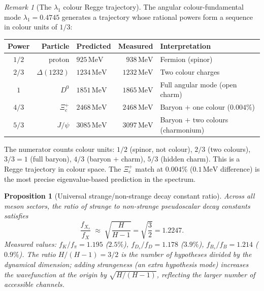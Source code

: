\documentclass[11pt,a4paper]{article}
\let\hline\midrule
\newtheorem{proposition}[theorem]{Proposition}
\theoremstyle{definition}
\theoremstyle{remark}
\newtheorem{remark}[theorem]{Remark}
\begin{document}
\begin{remark}[The $\lambda_1$ colour Regge trajectory]\label{rem:colour_regge}
The angular colour-fundamental mode $\lambda_1=0.4745$ generates a trajectory whose rational powers form a sequence in colour units of $1/3$:
\begin{center}
\renewcommand{\arraystretch}{1.15}
\begin{tabular}{crlrl}
\hline
Power & Particle & Predicted & Measured & Interpretation \\
\hline
$1/2$ & proton & $925\,\mathrm{MeV}$ & $938\,\mathrm{MeV}$ & Fermion (spinor) \\
$2/3$ & $\Delta(1232)$ & $1234\,\mathrm{MeV}$ & $1232\,\mathrm{MeV}$ & Two colour charges \\
$1$ & $D^0$ & $1851\,\mathrm{MeV}$ & $1865\,\mathrm{MeV}$ & Full angular mode (open charm) \\
$4/3$ & $\Xi_c^+$ & $2468\,\mathrm{MeV}$ & $2468\,\mathrm{MeV}$ & Baryon $+$ one colour ($0.004\%$) \\
$5/3$ & $J/\psi$ & $3085\,\mathrm{MeV}$ & $3097\,\mathrm{MeV}$ & Baryon $+$ two colours (charmonium) \\
\hline
\end{tabular}
\end{center}
The numerator counts colour units: $1/2$ (spinor, not colour), $2/3$ (two colours), $3/3=1$ (full baryon), $4/3$ (baryon $+$ charm), $5/3$ (hidden charm). This is a Regge trajectory in colour space. The $\Xi_c^+$ match at $0.004\%$ ($0.1\,\mathrm{MeV}$ difference) is the most precise eigenvalue-based prediction in the spectrum.
\end{remark}

\begin{proposition}[Universal strange/non-strange decay constant ratio]\label{prop:decay_const_ratio}
Across all meson sectors, the ratio of strange to non-strange pseudoscalar decay constants satisfies
\begin{equation}\label{eq:fX_ratio}
\frac{f_{X_s}}{f_X}\;\approx\;\sqrt{\frac{H}{H-1}}=\sqrt{\frac{3}{2}}=1.2247.
\end{equation}
Measured values: $f_K/f_\pi=1.195$ ($2.5\%$), $f_{D_s}/f_D=1.178$ ($3.9\%$), $f_{B_s}/f_B=1.214$ ($0.9\%$). The ratio $H/(H-1)=3/2$ is the number of hypotheses divided by the dynamical dimension; adding strangeness (an extra hypothesis mode) increases the wavefunction at the origin by $\sqrt{H/(H-1)}$, reflecting the larger number of accessible channels.
\end{proposition}
\end{document}
